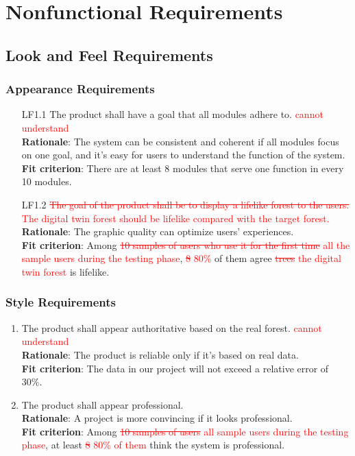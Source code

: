 \documentclass{article}
\begin{document}



\section{Nonfunctional Requirements}
\subsection{Look and Feel Requirements}
\subsubsection{Appearance Requirements}
\begin{enumerate}
    \item[LF1.1] The product shall have a goal that all modules adhere to. \textcolor{red}{cannot 
    understand}\\
    \textbf{Rationale}: The system can be consistent and coherent if all modules focus on one goal, and
     it's easy for users to understand the function of the system.\\
    \textbf{Fit criterion}:  There are at least 8 modules that serve one function in every 10 modules.
   
    \item[LF1.2] \textcolor{red}{\st{The goal of the product shall be to display a lifelike forest to
     the users.} The digital twin forest should be lifelike compared with the target
     forest.}\\
    \textbf{Rationale}: The graphic quality can optimize users' experiences.\\
    \textbf{Fit criterion}: Among \textcolor{red}{\st{10 samples of users who use it for the first
     time} all the sample users during the testing phase}, \textcolor{red}{\st{8} 80\%} of them agree
      \textcolor{red}{\st{trees} the digital twin forest} is lifelike.
\end{enumerate}
\subsubsection{Style Requirements}
\begin{enumerate}[LF2.1]
    \item The product shall appear authoritative based on the real forest. \textcolor{red}{cannot
    understand}\\
    \textbf{Rationale}: The product is reliable only if it's based on real data.\\
    \textbf{Fit criterion}: The data in our project will not exceed a relative error of 30\%.
    
    \item The product shall appear professional.\\
    \textbf{Rationale}: A project is more convincing if it looks professional.\\
    \textbf{Fit criterion}: Among \textcolor{red}{\st{10 samples of users} all sample users during the 
    testing phase}, at least \textcolor{red}{\st{8} 80\% of them} think the system is professional.
\end{enumerate}
\end{document}
